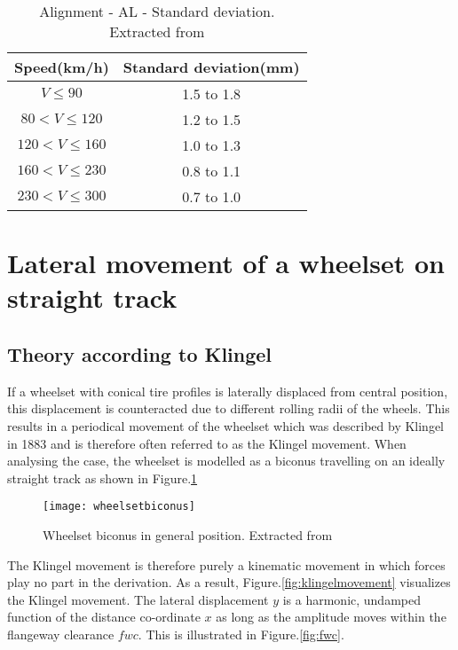 \begin{table}[h]
    \centering
    \caption{Alignment - AL - Standard deviation. Extracted from \cite[Table B.6]{13848}}
    \begin{tabular}{cc}
        \hline
        Speed(km/h) & Standard deviation(mm) \\
        \hline
        $V\leq 90$ & 1.5 to 1.8 \\
        $80 < V \leq 120$ & 1.2 to 1.5 \\
        $120 < V \leq 160$ & 1.0 to 1.3 \\
        $160 <V \leq 230$ & 0.8 to 1.1 \\
        $230 <V \leq 300$ & 0.7 to 1.0 \\
        \hline
    \end{tabular}
    \label{tab:lateraldeviation}
\end{table}

\section{Lateral movement of a wheelset on straight track}

\subsection{Theory according to Klingel}

If a wheelset with conical tire profiles is laterally displaced from central position, this displacement is counteracted due to different rolling radii of the wheels. This results in a periodical movement of the wheelset which was described by Klingel in 1883 and is therefore often referred to as the Klingel movement. When analysing the case, the wheelset is modelled as a biconus travelling on an ideally straight track as shown in Figure.\ref{fig:wheelsetbiconus}

\begin{figure}[h]
	\centering
	\texttt{[image: wheelsetbiconus]}
	\caption{Wheelset biconus in general position. Extracted from \cite[Figure 2.2]{esveld2001modern}}
	\label{fig:wheelsetbiconus}
\end{figure}


The Klingel movement is therefore purely a kinematic movement in which forces play no part in the derivation. As a result, Figure.\ref{fig:klingelmovement} visualizes the Klingel movement. The lateral displacement $y$ is a harmonic, undamped function of the distance co-ordinate $x$ as long as the amplitude moves within the flangeway clearance $fwc$. This is illustrated in Figure.\ref{fig:fwc}.

